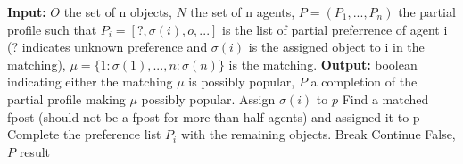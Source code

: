\documentclass{article}
\begin{document}
\begin{algorithm}[H]
\caption{VerifPossiblePopularMatching}
\begin{algorithmic}[1]
    \State \textbf{Input:} $O$ the set of n objects, $N$ the set of n agents, $P = (P_1, ..., P_n)$ the partial profile such that $P_i = [?, \sigma(i), o, ...]$ is the list of partial preferrence of agent i (? indicates unknown preference and $\sigma(i)$ is the assigned object to i in the matching), $\mu = \{1\colon \sigma(1), ..., n\colon \sigma(n)\}$ is the matching. 
    \State \textbf{Output:} boolean indicating either the matching $\mu$ is possibly popular, $P$ a completion of the partial profile making $\mu$ possibly popular.
    \State
                \State {}
                    \State Assign $\sigma(i)$ to $p$
                \Else
                    \State Find a matched fpost (should not be a fpost for more than half agents) and assigned it to p
                \EndIf
                \State Complete the preference list $P_i$ with the remaining objects.
                \State Break
            \Else
                \State {}
                    \State Continue
                \Else
                    \State {}
                    \State \Return False, $P$
                \EndIf
            \EndIf
        \EndFor
    \EndFor
    \State
    \Return result
\end{algorithmic}
\end{algorithm}
\end{document}
